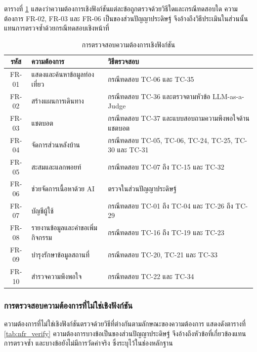 ตารางที่ \ref{tab:fr_coverage} แสดงว่าความต้องการเชิงฟังก์ชันแต่ละข้อถูกตรวจด้วยวิธีใดและกรณีทดสอบใด ความต้องการ FR-02, FR-03 และ FR-06 เป็นของส่วนปัญญาประดิษฐ์ จึงอ้างถึงวิธีประเมินในส่วนนั้นแทนการตรวจซ้ำด้วยกรณีทดสอบเชิงหน้าที่

\begin{table}[H]
\centering
\caption{การตรวจสอบความต้องการเชิงฟังก์ชัน}
\label{tab:fr_coverage}
\begin{tabular}{|c|p{4.2cm}|p{6.4cm}|}
\hline
\textbf{รหัส} & \textbf{ความต้องการ} & \textbf{วิธีตรวจสอบ} \\
\hline
FR-01 & แสดงและค้นหาข้อมูลท่องเที่ยว & กรณีทดสอบ TC-06 และ TC-35 \\ \hline
FR-02 & สร้างแผนการเดินทาง & กรณีทดสอบ TC-36 และตรวจตามหัวข้อ LLM-as-a-Judge \\ \hline
FR-03 & แชตบอต & กรณีทดสอบ TC-37 และแบบสอบถามความพึงพอใจด้านแชตบอต \\ \hline
FR-04 & จัดการส่วนหลังบ้าน & กรณีทดสอบ TC-05, TC-06, TC-24, TC-25, TC-30 และ TC-31 \\ \hline
FR-05 & สะสมและแลกพอยท์ & กรณีทดสอบ TC-07 ถึง TC-15 และ TC-32 \\ \hline
FR-06 & ช่วยจัดการเนื้อหาด้วย AI & ตรวจในส่วนปัญญาประดิษฐ์ \\ \hline
FR-07 & บัญชีผู้ใช้ & กรณีทดสอบ TC-01 ถึง TC-04 และ TC-26 ถึง TC-29 \\ \hline
FR-08 & รายงานข้อมูลและคำขอเพิ่มกิจกรรม & กรณีทดสอบ TC-16 ถึง TC-19 และ TC-23 \\ \hline
FR-09 & บำรุงรักษาข้อมูลสถานที่ & กรณีทดสอบ TC-20, TC-21 และ TC-33 \\ \hline
FR-10 & สำรวจความพึงพอใจ & กรณีทดสอบ TC-22 และ TC-34 \\
\hline
\end{tabular}
\end{table}

\subsubsection{การตรวจสอบความต้องการที่ไม่ใช่เชิงฟังก์ชัน}

ความต้องการที่ไม่ใช่เชิงฟังก์ชันตรวจด้วยวิธีที่ต่างกันตามลักษณะของความต้องการ แสดงดังตารางที่ \ref{tab:nfr_verify} ความต้องการบางข้อเป็นของส่วนปัญญาประดิษฐ์ จึงอ้างถึงหัวข้อที่เกี่ยวข้องแทนการตรวจซ้ำ และบางข้อยังไม่มีการวัดค่าจริง ซึ่งระบุไว้ในช่องหลักฐาน

